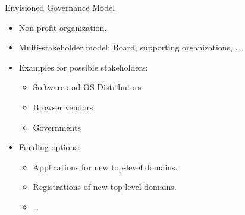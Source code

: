 \documentclass[aspectratio=169]{beamer}
\begin{document}
\begin{frame}{Envisioned Governance Model}
  \begin{itemize}
    \item Non-profit organization.
    \item Multi-stakeholder model: Board, supporting organizations, \ldots
    \item Examples for possible stakeholders:
      \begin{itemize}
        \item Software and OS Distributors
        \item Browser vendors
        \item Governments
      \end{itemize}
    \item Funding options:
      \begin{itemize}
        \item Applications for new top-level domains.
        \item Registrations of new top-level domains.
        \item \ldots
      \end{itemize}
  \end{itemize}
\end{frame}
\end{document}
